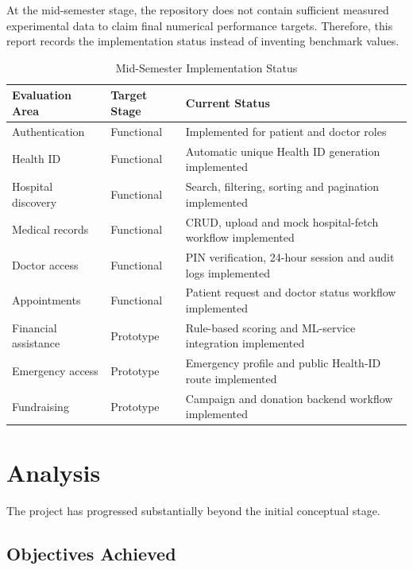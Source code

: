 \documentclass{tietreport}
\begin{document}
At the mid-semester stage, the repository does not contain sufficient
measured experimental data to claim final numerical performance
targets. Therefore, this report records the implementation status
instead of inventing benchmark values.

\begin{table}[h]
\centering
\begin{tabular}{|p{}|p{}|p{}|}
  \hline
  \textbf{Evaluation Area} &
  \textbf{Target Stage} &
  \textbf{Current Status} \\
  \hline
  Authentication &
  Functional &
  Implemented for patient and doctor roles \\
  \hline
  Health ID &
  Functional &
  Automatic unique Health ID generation implemented \\
  \hline
  Hospital discovery &
  Functional &
  Search, filtering, sorting and pagination implemented \\
  \hline
  Medical records &
  Functional &
  CRUD, upload and mock hospital-fetch workflow implemented \\
  \hline
  Doctor access &
  Functional &
  PIN verification, 24-hour session and audit logs implemented \\
  \hline
  Appointments &
  Functional &
  Patient request and doctor status workflow implemented \\
  \hline
  Financial assistance &
  Prototype &
  Rule-based scoring and ML-service integration implemented \\
  \hline
  Emergency access &
  Prototype &
  Emergency profile and public Health-ID route implemented \\
  \hline
  Fundraising &
  Prototype &
  Campaign and donation backend workflow implemented \\
  \hline
\end{tabular}
\caption{Mid-Semester Implementation Status}
\label{tab:midsem-status}
\end{table}

\section{Analysis}

The project has progressed substantially beyond the initial conceptual
stage.

\subsection{Objectives Achieved}
\end{document}
